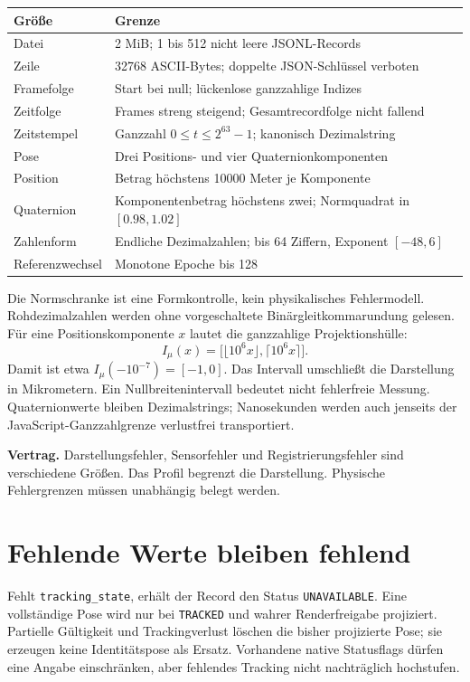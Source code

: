 \documentclass[11pt,a4paper]{article}
\newcommand{\contract}[1]{\vspace{3pt}\noindent\colorbox{pale}{\parbox{\dimexpr\linewidth-2\fboxsep}{\textbf{Vertrag.} #1}}\vspace{5pt}}
\newcommand{\nextsection}[2]{\clearpage{\color{accent}\small\textsf{#1}}\section{#2}}
\begin{document}
\begin{tabularx}{\linewidth}{@{}lY@{}}\toprule
Größe & Grenze\\\midrule
Datei & 2 MiB; 1 bis 512 nicht leere JSONL-Records\\
Zeile & 32768 ASCII-Bytes; doppelte JSON-Schlüssel verboten\\
Framefolge & Start bei null; lückenlose ganzzahlige Indizes\\
Zeitfolge & Frames streng steigend; Gesamtrecordfolge nicht fallend\\
Zeitstempel & Ganzzahl $0\leq t\leq2^{63}-1$; kanonisch Dezimalstring\\
Pose & Drei Positions- und vier Quaternionkomponenten\\
Position & Betrag höchstens 10000 Meter je Komponente\\
Quaternion & Komponentenbetrag höchstens zwei; Normquadrat in $[0.98,1.02]$\\
Zahlenform & Endliche Dezimalzahlen; bis 64 Ziffern, Exponent $[-48,6]$\\
Referenzwechsel & Monotone Epoche bis 128\\\bottomrule
\end{tabularx}

Die Normschranke ist eine Formkontrolle, kein physikalisches
Fehlermodell. Rohdezimalzahlen werden ohne vorgeschaltete
Binärgleitkommarundung gelesen. Für eine Positionskomponente $x$
lautet die ganzzahlige Projektionshülle:
\[
 I_\mu(x)=\bigl[\lfloor 10^6x\rfloor,\lceil10^6x\rceil\bigr].
\]
Damit ist etwa $I_\mu(-10^{-7})=[-1,0]$. Das Intervall umschließt
die Darstellung in Mikrometern. Ein Nullbreitenintervall bedeutet
nicht fehlerfreie Messung. Quaternionwerte bleiben Dezimalstrings;
Nanosekunden werden auch jenseits der JavaScript-Ganzzahlgrenze
verlustfrei transportiert.

\contract{Darstellungsfehler, Sensorfehler und Registrierungsfehler
sind verschiedene Größen. Das Profil begrenzt die Darstellung.
Physische Fehlergrenzen müssen unabhängig belegt werden.}

\nextsection{85 / TRACKING UND LEBENSZYKLUS}{Fehlende Werte bleiben fehlend}
Fehlt \texttt{tracking\_state}, erhält der Record den Status
\texttt{UNAVAILABLE}. Eine vollständige Pose wird nur bei
\texttt{TRACKED} und wahrer Renderfreigabe projiziert.
Partielle Gültigkeit und Trackingverlust löschen die bisher
projizierte Pose; sie erzeugen keine Identitätspose als Ersatz.
Vorhandene native Statusflags dürfen eine Angabe einschränken,
aber fehlendes Tracking nicht nachträglich hochstufen.
\end{document}
